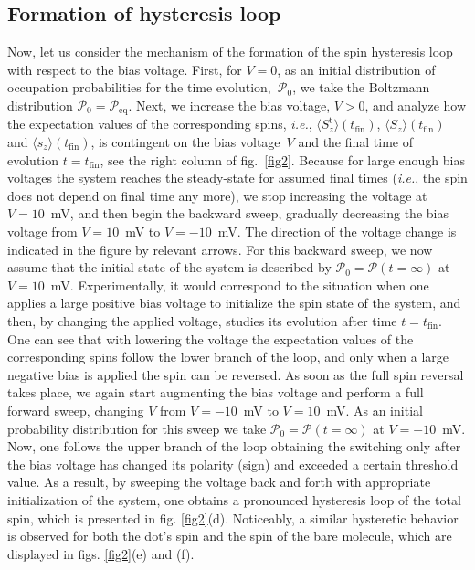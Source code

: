 \documentclass[doublecol]{epl2} %
\newcommand{\prob}{\mathcal{P}}
\newcommand{\tfin}{t_\text{fin}}
\newcommand{\ie}{\emph{i.e.}\xspace}
\begin{document}
\subsection{Formation of hysteresis loop}

Now, let us consider the mechanism of the formation
of the spin hysteresis loop with respect to the bias voltage.
First, for \mbox{$V=0$}, as an initial distribution of occupation probabilities
for the time evolution,~$\bm{\prob}_0$, we take the Boltzmann distribution \mbox{$\bm{\prob}_0 = \bm{\prob}_\text{eq}$}.
%
Next, we increase the bias voltage, \mbox{$V>0$}, and analyze how the 
expectation values of the corresponding spins, \ie, $\langle S_z^\text{t} \rangle(\tfin)$,
$\langle S_z \rangle(\tfin)$ and $\langle s_z \rangle(\tfin)$, is contingent on the bias voltage~$V$ and 
the final time of evolution \mbox{$t=\tfin$}, see the right column of fig.~\ref{fig2}.
Because for large enough bias voltages the system reaches the steady-state
for assumed final times (\ie, the spin does not depend on final time any more),
we stop increasing the voltage at \mbox{$V=10$}~mV, and then begin the backward sweep,
gradually decreasing the bias voltage from \mbox{$V=10$}~mV to \mbox{$V=-10$}~mV.
The direction of the voltage change is indicated in the figure by relevant arrows.
For this backward sweep, we now assume that the initial state of the system
is described by \mbox{$\bm{\prob}_0 = \bm{\prob}(t=\infty)$} at \mbox{$V=10$}~mV.
Experimentally, it would correspond to the situation
when one applies a large positive bias voltage to initialize the spin state of the system,
and then, by changing the applied voltage, studies its evolution after time \mbox{$t=\tfin$}.
One can see that with lowering the voltage the expectation values of the corresponding spins
follow the lower branch of the loop,  and only when a large negative bias
is applied  the spin can be reversed. As soon as the full spin reversal takes place,
we again start augmenting the bias voltage
and perform a full forward sweep, changing $V$ from \mbox{$V=-10$}~mV to \mbox{$V=10$}~mV.
As an initial probability distribution for this sweep
we take \mbox{$\bm{\prob}_0 = \bm{\prob}(t=\infty)$} at \mbox{$V=-10$}~mV.
Now, one follows the upper branch of the loop
obtaining the switching only after the bias voltage has 
changed its polarity (sign) and exceeded a certain threshold value.
As a result, by sweeping the voltage back and forth
with appropriate initialization of the system,
one obtains a pronounced hysteresis loop of the total spin,
which is presented in fig. \ref{fig2}(d).
Noticeably, a similar hysteretic behavior 
is observed for both the dot's spin and the spin of the bare molecule,
which are displayed in figs. \ref{fig2}(e) and (f).
\end{document}

